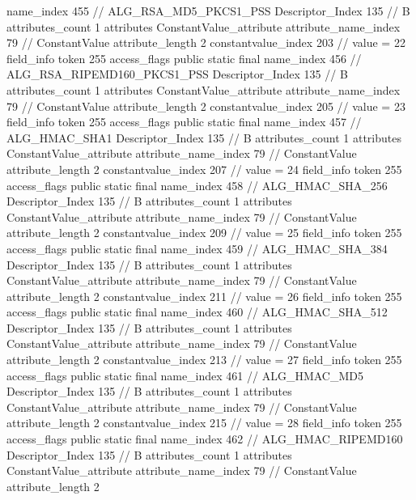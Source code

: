 {{{{{				name_index	455		// ALG_RSA_MD5_PKCS1_PSS
				Descriptor_Index	135		// B
				attributes_count	1
				attributes {
				ConstantValue_attribute {
					attribute_name_index	79		// ConstantValue
					attribute_length	2
					constantvalue_index	203		// value = 22
				}
				}
			}
			field_info {
				token	255
				access_flags	public static final
				name_index	456		// ALG_RSA_RIPEMD160_PKCS1_PSS
				Descriptor_Index	135		// B
				attributes_count	1
				attributes {
				ConstantValue_attribute {
					attribute_name_index	79		// ConstantValue
					attribute_length	2
					constantvalue_index	205		// value = 23
				}
				}
			}
			field_info {
				token	255
				access_flags	public static final
				name_index	457		// ALG_HMAC_SHA1
				Descriptor_Index	135		// B
				attributes_count	1
				attributes {
				ConstantValue_attribute {
					attribute_name_index	79		// ConstantValue
					attribute_length	2
					constantvalue_index	207		// value = 24
				}
				}
			}
			field_info {
				token	255
				access_flags	public static final
				name_index	458		// ALG_HMAC_SHA_256
				Descriptor_Index	135		// B
				attributes_count	1
				attributes {
				ConstantValue_attribute {
					attribute_name_index	79		// ConstantValue
					attribute_length	2
					constantvalue_index	209		// value = 25
				}
				}
			}
			field_info {
				token	255
				access_flags	public static final
				name_index	459		// ALG_HMAC_SHA_384
				Descriptor_Index	135		// B
				attributes_count	1
				attributes {
				ConstantValue_attribute {
					attribute_name_index	79		// ConstantValue
					attribute_length	2
					constantvalue_index	211		// value = 26
				}
				}
			}
			field_info {
				token	255
				access_flags	public static final
				name_index	460		// ALG_HMAC_SHA_512
				Descriptor_Index	135		// B
				attributes_count	1
				attributes {
				ConstantValue_attribute {
					attribute_name_index	79		// ConstantValue
					attribute_length	2
					constantvalue_index	213		// value = 27
				}
				}
			}
			field_info {
				token	255
				access_flags	public static final
				name_index	461		// ALG_HMAC_MD5
				Descriptor_Index	135		// B
				attributes_count	1
				attributes {
				ConstantValue_attribute {
					attribute_name_index	79		// ConstantValue
					attribute_length	2
					constantvalue_index	215		// value = 28
				}
				}
			}
			field_info {
				token	255
				access_flags	public static final
				name_index	462		// ALG_HMAC_RIPEMD160
				Descriptor_Index	135		// B
				attributes_count	1
				attributes {
				ConstantValue_attribute {
					attribute_name_index	79		// ConstantValue
					attribute_length	2
}}}}}}}
